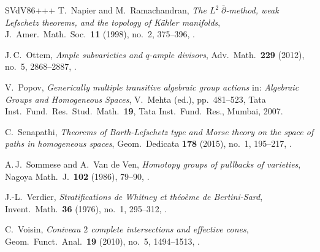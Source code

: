 \begin{thebibliography}{SVdV86+++}
T.~Napier and M.~Ramachandran,  \emph{The $L^2\;\bar\partial$-method, weak Lefschetz theorems, and the topology of K\"ahler manifolds}, J.~Amer.\ Math.\ Soc.\ \textbf{11} (1998), no.~2, 375--396, .

J.\,C.~Ottem, \emph{Ample subvarieties and $q$-ample divisors}, Adv.\ Math.\ \textbf{229} (2012), no.~5, 2868--2887, .

V.~Popov, \emph{Generically multiple transitive algebraic group actions} in: \emph{Algebraic Groups and Homogeneous Spaces}, V.~Mehta (ed.), pp.~481--523, Tata Inst.\ Fund.\ Res.\ Stud.\ Math.\ \textbf{19},  Tata Inst.\ Fund.\ Res., Mumbai, 2007.

C.~Senapathi, \emph{Theorems of Barth-Lefschetz type and Morse theory on the space of paths in homogeneous spaces}, Geom.\ Dedicata \textbf{178} (2015), no.~1, 195--217, .

A.\,J.~Sommese and A.~Van de Ven, \emph{Homotopy groups of pullbacks of varieties}, Nagoya Math.~J.\ \textbf{102} (1986), 79--90, .

J.-L.~Verdier, \emph{Stratifications de Whitney et th\'eo\`eme de Bertini-Sard}, Invent.\ Math.\ \textbf{36} (1976), no.~1, 295--312, .

C.~Voisin, \emph{Coniveau $2$ complete intersections and effective cones}, Geom.\  Funct.\ Anal.\ \textbf{19} (2010), no.~5, 1494--1513, .

\end{thebibliography}

